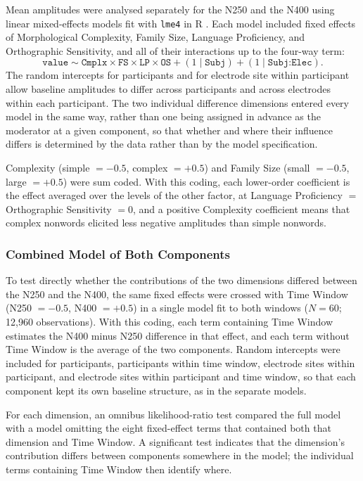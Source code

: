 \documentclass[utf8]{FrontiersinHarvard} %
\begin{document}
Mean amplitudes were analysed separately for the N250 and the N400 using linear mixed-effects models fit with \texttt{lme4} \citep{batesFittingLinearMixedeffects2015} in R \citep{rcoreteamLanguageEnvironmentStatistical2026}. Each model included fixed effects of Morphological Complexity, Family Size, Language Proficiency, and Orthographic Sensitivity, and all of their interactions up to the four-way term:
\[
\texttt{value} \sim \texttt{Cmplx} \times \texttt{FS} \times \texttt{LP} \times \texttt{OS} + (1 \mid \texttt{Subj}) + (1 \mid \texttt{Subj:Elec}).
\]
The random intercepts for participants and for electrode site within participant allow baseline amplitudes to differ across participants and across electrodes within each participant. The two individual difference dimensions entered every model in the same way, rather than one being assigned in advance as the moderator at a given component, so that whether and where their influence differs is determined by the data rather than by the model specification.

Complexity (simple $= -0.5$, complex $= +0.5$) and Family Size (small $= -0.5$, large $= +0.5$) were sum coded. With this coding, each lower-order coefficient is the effect averaged over the levels of the other factor, at Language Proficiency $=$ Orthographic Sensitivity $= 0$, and a positive Complexity coefficient means that complex nonwords elicited less negative amplitudes than simple nonwords.

\subsubsection{Combined Model of Both Components}

To test directly whether the contributions of the two dimensions differed between the N250 and the N400, the same fixed effects were crossed with Time Window (N250 $= -0.5$, N400 $= +0.5$) in a single model fit to both windows ($N = 60$; 12,960 observations). With this coding, each term containing Time Window estimates the N400 minus N250 difference in that effect, and each term without Time Window is the average of the two components. Random intercepts were included for participants, participants within time window, electrode sites within participant, and electrode sites within participant and time window, so that each component kept its own baseline structure, as in the separate models.

For each dimension, an omnibus likelihood-ratio test compared the full model with a model omitting the eight fixed-effect terms that contained both that dimension and Time Window. A significant test indicates that the dimension's contribution differs between components somewhere in the model; the individual terms containing Time Window then identify where.
\end{document}
